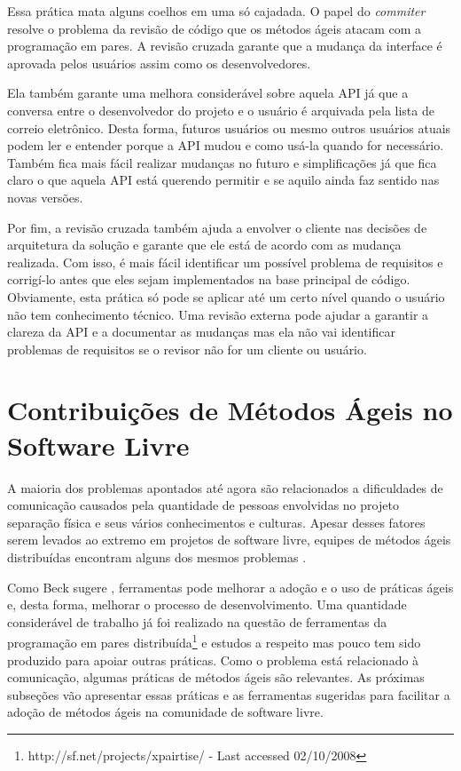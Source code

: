 Essa prática mata alguns coelhos em uma só cajadada. O papel do
\emph{commiter} resolve o problema da revisão de código que os métodos
ágeis atacam com a programação em pares. A revisão cruzada garante que
a mudança da interface é aprovada pelos usuários assim como os
desenvolvedores.

Ela também garante uma melhora considerável sobre aquela API já que a
conversa entre o desenvolvedor do projeto e o usuário é arquivada pela
lista de correio eletrônico. Desta forma, futuros usuários ou mesmo
outros usuários atuais podem ler e entender porque a API mudou e como
usá-la quando for necessário. Também fica mais fácil realizar mudanças
no futuro e simplificações já que fica claro o que aquela API está
querendo permitir e se aquilo ainda faz sentido nas novas versões.

Por fim, a revisão cruzada também ajuda a envolver o cliente nas
decisões de arquitetura da solução e garante que ele está de acordo
com as mudança realizada. Com isso, é mais fácil identificar um
possível problema de requisitos e corrigí-lo antes que eles sejam
implementados na base principal de código. Obviamente, esta prática só
pode se aplicar até um certo nível quando o usuário não tem
conhecimento técnico. Uma revisão externa pode ajudar a garantir a
clareza da API e a documentar as mudanças mas ela não vai identificar
problemas de requisitos se o revisor não for um cliente ou usuário.

\section{Contribuições de Métodos Ágeis no Software Livre}
\label{sec:agile-improve-os}

A maioria dos problemas apontados até agora são relacionados a
dificuldades de comunicação causados pela quantidade de pessoas
envolvidas no projeto separação física e seus vários conhecimentos e
culturas. Apesar desses fatores serem levados ao extremo em projetos
de software livre, equipes de métodos ágeis distribuídas encontram
alguns dos mesmos problemas \cite{Sutherland2007,Maurer2002}.

Como Beck sugere \cite{Beck2008}, ferramentas pode melhorar a adoção e
o uso de práticas ágeis e, desta forma, melhorar o processo de
desenvolvimento. Uma quantidade considerável de trabalho já foi
realizado na questão de ferramentas da programação em pares
distribuída\footnote{http://sf.net/projects/xpairtise/ - Last accessed
  02/10/2008} e estudos a respeito \cite{Nagappan2003} mas pouco tem
sido produzido para apoiar outras práticas. Como o problema está
relacionado à comunicação, algumas práticas de métodos ágeis são
relevantes. As próximas subseções vão apresentar essas práticas e as
ferramentas sugeridas para facilitar a adoção de métodos ágeis na
comunidade de software livre.

